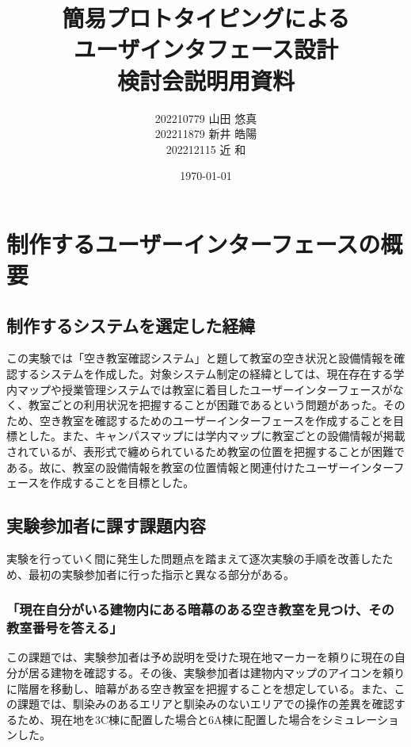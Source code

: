 \documentclass[12pt,a4paper,dvipdf]{jsarticle}
\title{簡易プロトタイピングによる\\ユーザインタフェース設計\\検討会説明用資料}
\author{202210779 山田 悠真\\202211879 新井 皓陽\\202212115 近 和}
\date{\today}
\begin{document}
\maketitle
\newpage


\section{制作するユーザーインターフェースの概要}
\subsection{制作するシステムを選定した経緯}
この実験では「空き教室確認システム」と題して教室の空き状況と設備情報を確認するシステムを作成した。対象システム制定の経緯としては、現在存在する学内マップや授業管理システムでは教室に着目したユーザーインターフェースがなく、教室ごとの利用状況を把握することが困難であるという問題があった。そのため、空き教室を確認するためのユーザーインターフェースを作成することを目標とした。また、キャンパスマップには学内マップに教室ごとの設備情報が掲載されているが、表形式で纏められているため教室の位置を把握することが困難である。故に、教室の設備情報を教室の位置情報と関連付けたユーザーインターフェースを作成することを目標とした。
\subsection{実験参加者に課す課題内容}
実験を行っていく間に発生した問題点を踏まえて逐次実験の手順を改善したため、最初の実験参加者に行った指示と異なる部分がある。
\subsubsection{「現在自分がいる建物内にある暗幕のある空き教室を見つけ、その教室番号を答える」}
この課題では、実験参加者は予め説明を受けた現在地マーカーを頼りに現在の自分が居る建物を確認する。その後、実験参加者は建物内マップのアイコンを頼りに階層を移動し、暗幕がある空き教室を把握することを想定している。また、この課題では、馴染みのあるエリアと馴染みのないエリアでの操作の差異を確認するため、現在地を3C棟に配置した場合と6A棟に配置した場合をシミュレーションした。
\end{document}
